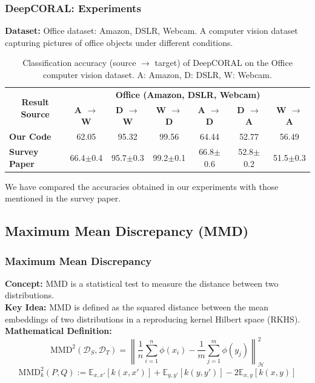 \documentclass{beamer}
\begin{document}
\begin{frame}
    \frametitle{DeepCORAL: Experiments}
    \textbf{Dataset:} Office dataset: Amazon, DSLR, Webcam. A computer vision dataset capturing pictures of office objects under different conditions.
    \begin{table}
        \caption{Classification accuracy (source $\rightarrow$ target) of DeepCORAL on the Office computer vision dataset. A: Amazon, D: DSLR, W: Webcam.}
        \label{comparePerformance2}
        \begin{scriptsize}
        \begin{center}
        {\renewcommand{\arraystretch}{1.4}
        \begin{tabular}{@{}l cccccc@{}}
        \toprule
        \multicolumn{1}{c}{\multirow{2}{*}{\textbf{Result Source}}} & \multicolumn{6}{c}{\textbf{Office (Amazon, DSLR, Webcam)}} \\
        \cmidrule{2-7}
         & \textbf{A $\rightarrow$ W} & \textbf{D $\rightarrow$ W} & \textbf{W $\rightarrow$ D} & \textbf{A $\rightarrow$ D} & \textbf{D $\rightarrow$ A} & \textbf{W $\rightarrow$ A} \\
        \midrule
        \textbf{Our Code} & 62.05 & 95.32 & 99.56 & 64.44 & 52.77 & 56.49\\
        \hline
        \textbf{Survey Paper} & 66.4$\pm$0.4 & 95.7$\pm$0.3 & 99.2$\pm$0.1 & 66.8$\pm$0.6 & 52.8$\pm$0.2 & 51.5$\pm$0.3\\
        \bottomrule
        \end{tabular}
        }
        \end{center}
        \end{scriptsize}
    \end{table}
    We have compared the accuracies obtained in our experiments with those
    mentioned in the survey paper.
\end{frame}

\subsection{Maximum Mean Discrepancy (MMD)}
\begin{frame}
    \frametitle{Maximum Mean Discrepancy}
    \textbf{Concept:} MMD is a statistical test to measure the distance between two distributions.\\
    \textbf{Key Idea:} MMD is defined as the squared distance between the mean embeddings of two distributions in a reproducing kernel Hilbert space (RKHS).\\
    \textbf{Mathematical Definition:}
    \[
        \text{MMD}^2(\mathcal{D}_S, \mathcal{D}_T) = \left\| \frac{1}{n} \sum_{i=1}^{n} \phi(x_i) - \frac{1}{m} \sum_{j=1}^{m} \phi(y_j) \right\|_{\mathcal{H}}^2
    \]
    \[
        \text{MMD}^2_k(P,Q) := \mathbb{E}_{x,x'}[k(x,x')] + \mathbb{E}_{y,y'}[k(y,y')] - 2\mathbb{E}_{x,y}[k(x,y)]
    \]   
\end{frame}
\end{document}
